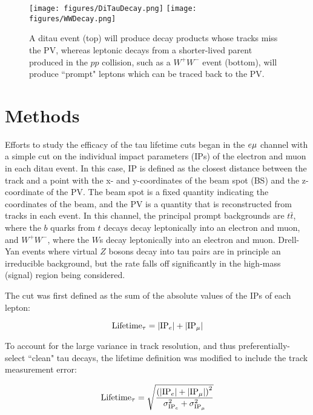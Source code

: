 \begin{figure}[tbh!]
\centering
\texttt{[image: figures/DiTauDecay.png]}
\texttt{[image: figures/WWDecay.png]}
\caption{A ditau event (top) will produce decay products whose tracks miss the PV, whereas leptonic decays from a shorter-lived parent produced in the $pp$ collision, such as a $W^+W^-$ event (bottom), will produce ``prompt" leptons which can be traced back to the PV.}
\label{fig:PromptVsTauDecay}
\end{figure}

\section{Methods}

Efforts to study the efficacy of the tau lifetime cuts began in the $e\mu$ channel with a simple cut on the individual impact parameters (IPs) of the electron and muon in each ditau event. In this case, IP is defined as the closest distance between the track and a point with the x- and y-coordinates of the beam spot (BS) and the z-coordinate of the PV. The beam spot is a fixed quantity indicating the coordinates of the beam, and the PV is a quantity that is reconstructed from tracks in each event. In this channel, the principal prompt backgrounds are $t\bar{t}$, where the $b$ quarks from $t$ decays decay leptonically into an electron and muon, and $W^+W^-$, where the $W$s decay leptonically into an electron and muon. Drell-Yan events where virtual $Z$ bosons decay into tau pairs are in principle an irreducible background, but the rate falls off significantly in the high-mass (signal) region being considered.

The cut was first defined as the sum of the absolute values of the IPs of each lepton:

\begin{equation}
\centering
\textrm{Lifetime}_\tau = |\textrm{IP}_e| + |\textrm{IP}_\mu|
\end{equation}

\noindent To account for the large variance in track resolution, and thus preferentially-select ``clean" tau decays, the lifetime definition was modified to include the track measurement error:

\begin{equation}
\centering
\textrm{Lifetime}_\tau = \sqrt{\frac{\left(|\textrm{IP}_e| + |\textrm{IP}_\mu|\right)^2}{\sigma_{\textrm{IP}_e}^2 + \sigma_{\textrm{IP}_\mu}^2}}
\label{eq:IP}
\end{equation}

